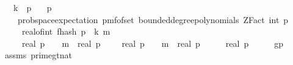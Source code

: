 \begin{isabellebody}
\ \ \ {\isachardoublequoteopen}k\ {\isacharless}{\kern0pt}\ p{\isachardoublequoteclose}\isanewline
\ \ \ {\isachardoublequoteopen}p\ {\isachargreater}{\kern0pt}\ {}{\isachardoublequoteclose}\ \isanewline
\ \ \isanewline
\ \ \ \ {\isachardoublequoteopen}prob{\isacharunderscore}{\kern0pt}space{\isachardot}{\kern0pt}expectation\ {\isacharparenleft}{\kern0pt}pmf{\isacharunderscore}{\kern0pt}of{\isacharunderscore}{\kern0pt}set\ {\isacharparenleft}{\kern0pt}bounded{\isacharunderscore}{\kern0pt}degree{\isacharunderscore}{\kern0pt}polynomials\ {\isacharparenleft}{\kern0pt}ZFact\ {\isacharparenleft}{\kern0pt}int\ p{\isacharparenright}{\kern0pt}{\isacharparenright}{\kern0pt}\ {}{\isacharparenright}{\kern0pt}{\isacharparenright}{\kern0pt}\ \isanewline
\ \ \ \ {\isacharparenleft}{\kern0pt}{\isasymlambda}{\isasymomega}{\isachardot}{\kern0pt}\ real{\isacharunderscore}{\kern0pt}of{\isacharunderscore}{\kern0pt}int\ {\isacharparenleft}{\kern0pt}f{}{\isacharunderscore}{\kern0pt}hash\ p\ {\isasymomega}\ k{\isacharparenright}{\kern0pt}\ {\isacharcircum}{\kern0pt}m{\isacharparenright}{\kern0pt}\ {\isacharequal}{\kern0pt}\ \isanewline
\ \ \ \ \ {\isacharparenleft}{\kern0pt}{\isacharparenleft}{\kern0pt}{\isacharparenleft}{\kern0pt}real\ p\ {\isacharminus}{\kern0pt}\ {}{\isacharparenright}{\kern0pt}\ {\isacharcircum}{\kern0pt}\ m\ {\isacharasterisk}{\kern0pt}\ {\isacharparenleft}{\kern0pt}real\ p\ {\isacharplus}{\kern0pt}\ {}{\isacharparenright}{\kern0pt}\ {\isacharplus}{\kern0pt}\ {\isacharparenleft}{\kern0pt}{\isacharminus}{\kern0pt}\ real\ p\ {\isacharminus}{\kern0pt}\ {}{\isacharparenright}{\kern0pt}\ {\isacharcircum}{\kern0pt}\ m\ {\isacharasterisk}{\kern0pt}\ {\isacharparenleft}{\kern0pt}real\ p\ {\isacharminus}{\kern0pt}\ {}{\isacharparenright}{\kern0pt}{\isacharparenright}{\kern0pt}\ {\isacharslash}{\kern0pt}\ {\isacharparenleft}{\kern0pt}{}\ {\isacharasterisk}{\kern0pt}\ real\ p{\isacharparenright}{\kern0pt}{\isacharparenright}{\kern0pt}{\isachardoublequoteclose}\isanewline
%
\isadelimproof
%
\endisadelimproof
%
\isatagproof
{}\isamarkupfalse%
\ {\isacharminus}{\kern0pt}\isanewline
\ \ \isamarkupfalse%
\ g{\isacharcolon}{\kern0pt}{\isachardoublequoteopen}p\ {\isachargreater}{\kern0pt}\ {}{\isachardoublequoteclose}\ \isamarkupfalse%
\ assms{\isacharparenleft}{\kern0pt}{}{\isacharparenright}{\kern0pt}\ prime{\isacharunderscore}{\kern0pt}gt{\isacharunderscore}{\kern0pt}{}{\isacharunderscore}{\kern0pt}nat\ \isamarkupfalse%

\end{isabellebody}
